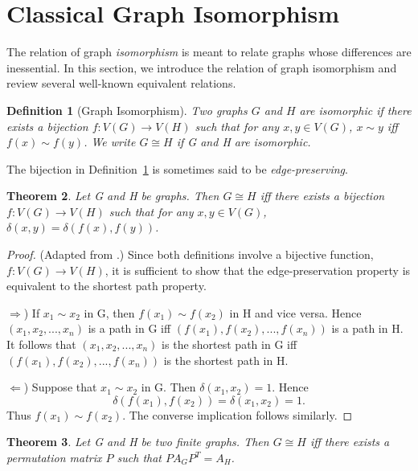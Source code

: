 \documentclass[12pt]{article}
\newtheorem{thm}{Theorem}[section]
\newtheorem{defn}[thm]{Definition}
\begin{document}
\section{Classical Graph Isomorphism}
\label{sec:ciso}

The relation of graph \emph{isomorphism} is meant to relate graphs
whose differences are inessential. In this section, we introduce the
relation of graph isomorphism and review several well-known equivalent
relations.

\begin{defn}[Graph Isomorphism]
  \label{def:ciso}
  Two graphs $G$ and $H$ are \emph{isomorphic} if there exists a
  bijection $f:V(G) \to V(H)$ such that for any $x, y \in V(G)$, $x
  \sim y$ iff $f(x) \sim f(y)$. We write $G\cong H$ if G and H are
  isomorphic.
\end{defn}

The bijection in Definition~\ref{def:ciso} is sometimes said to be
\emph{edge-preserving}.

\begin{thm}
  \label{thm:shortest}
  Let G and H be graphs. Then $G \cong H$ iff there exists a bijection
  $f:V(G) \to V(H)$ such that for any $x, y \in V(G)$, $\delta(x, y) =
  \delta(f(x), f(y))$.
\end{thm}

\begin{proof}
(Adapted from \cite{ss2014}.) Since both definitions involve a
  bijective function, $f:V(G) \to V(H)$, it is sufficient to show that
  the edge-preservation property is equivalent to the shortest path
  property. 

$\Rightarrow$) If $x_1 \sim x_2$ in G, then $f(x_1) \sim f(x_2)$ in H
and vice versa. Hence $(x_1, x_2, ..., x_n)$ is a path in G iff
$(f(x_1), f(x_2), ..., f(x_n))$ is a path in H. It follows that $(x_1,
x_2, ..., x_n)$ is the shortest path in G iff $(f(x_1), f(x_2), ...,
f(x_n))$ is the shortest path in H.

$\Leftarrow$) Suppose that $x_1 \sim x_2$ in G. Then $\delta(x_1, x_2)
= 1$. Hence 
\[
\delta (f(x_1),f(x_2)) = \delta (x_1,x_2)=1. 
\]
Thus
$f(x_1) \sim f(x_2)$. The converse implication follows similarly.
\end{proof}

\begin{thm}
  \label{thm:permutation}
  Let G and H be two finite graphs. Then $G \cong H$ iff there exists
  a permutation matrix $P$ such that $PA_GP^T = A_H$.
\end{thm}
\end{document}
